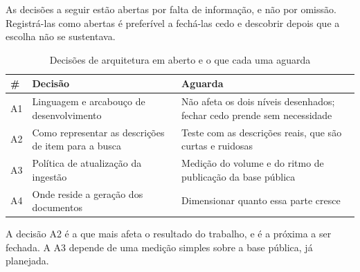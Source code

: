 As decisões a seguir estão abertas por falta de informação, e não por omissão.
Registrá-las como abertas é preferível a fechá-las cedo e descobrir depois que a
escolha não se sustentava.

\begin{table}[H]
  \centering
  \caption{Decisões de arquitetura em aberto e o que cada uma aguarda}
  \label{tab:decisoes-abertas}
  \begin{ufopaespacosimples}
  \small
  \begin{tabularx}{\textwidth}{@{}lXX@{}}
    \toprule
    \textbf{\#} & \textbf{Decisão} & \textbf{Aguarda} \\
    \midrule
    A1 & Linguagem e arcabouço de desenvolvimento & Não afeta os dois níveis
      desenhados; fechar cedo prende sem necessidade \\
    A2 & Como representar as descrições de item para a busca & Teste com as
      descrições reais, que são curtas e ruidosas \\
    A3 & Política de atualização da ingestão & Medição do volume e do ritmo de
      publicação da base pública \\
    A4 & Onde reside a geração dos documentos & Dimensionar quanto essa parte
      cresce \\
    \bottomrule
  \end{tabularx}
  \end{ufopaespacosimples}
\end{table}

A decisão A2 é a que mais afeta o resultado do trabalho, e é a próxima a ser
fechada. A A3 depende de uma medição simples sobre a base pública, já planejada.
